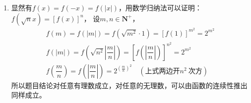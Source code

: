 \begin{enumerate}[label={\textbf{\thechapter.\arabic*}},leftmargin=
    \inteval{\myenumleftmargin}pt]
\item 
显然有$ f(x)=f(-x)=f(|x|) $，用数学归纳法可以证明：$ f(\sqrt{n}x)=[f(x)]^n $，
设$ m,n \in \textbf{N}^+ $，
\begin{gather*}
    f(m)=f(|m|)=f(\sqrt{m^2}\cdot 1)=[f(1)]^{m^2}=2^{m^2} \\
    f(|m|)=f\left(\sqrt{n^2}\left|\dfrac{m}{n}\right|\right)
    =\left[f\left(\left|\dfrac{m}{n}\right|\right)\right]^{n^2}=2^{m^2} \\
    f\left(\dfrac{m}{n}\right)=f\left(\left|\dfrac{m}{n}\right|\right)
    =2^{(\frac{m}{n})^2} \quad (\text{上式两边开} n^2\ \text{次方} )
\end{gather*}
所以题目结论对任意有理数成立，对任意的无理数，可以由函数的连续性推出同样成立。


\end{enumerate}
\myfootnote{\CopyrightStatementChap}

\cleardoublepage

